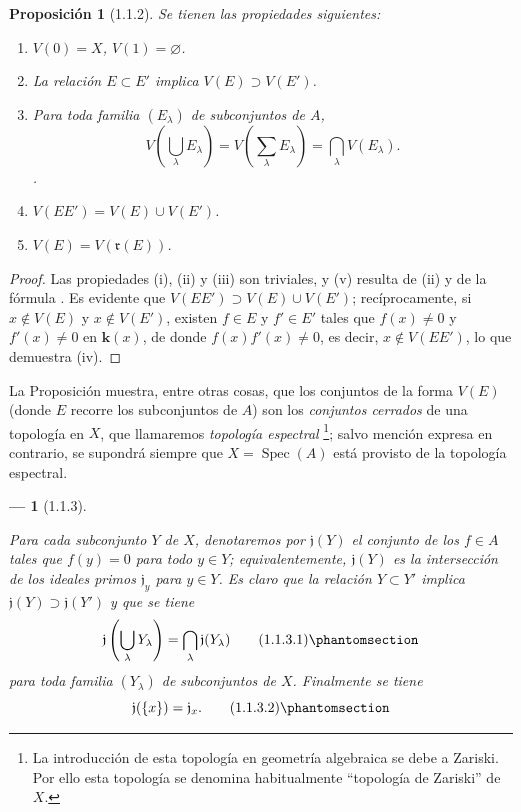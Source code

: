 \documentclass[oneside]{amsart}
\theoremstyle{ega-env-style}
\newtheorem*{env}{---}
\theoremstyle{ega-thm-env-style}
\newtheorem*{proposition}{Proposición}
\theoremstyle{ega-defn-env-style}
\newcommand{\oldpage}[2][]{{\marginnote{\normalfont{\textbf{#1}~|~#2}}}\ignorespaces}
\let\EGAOriginalLabel\label
\renewcommand{\label}[1]{\phantomsection\EGAOriginalLabel{#1}}
\begin{document}
\begin{proposition}[1.1.2]
\label{I.1.1.2}
Se tienen las propiedades siguientes:
\begin{enumerate}
  \item[{\rm(i)}] $V(0)=X$, $V(1)=\varnothing$.
  \item[{\rm(ii)}] La relación $E\subset E'$ implica $V(E)\supset V(E')$.
  \item[{\rm(iii)}] Para toda familia $(E_\lambda)$ de subconjuntos de $A$, \[
    V\left(\bigcup_\lambda E_\lambda\right)
      =V\left(\sum_\lambda E_\lambda\right)
      =\bigcap_\lambda V(E_\lambda).
  \].
  \item[{\rm(iv)}] $V(EE')=V(E)\cup V(E')$.
  \item[{\rm(v)}] $V(E)=V(\mathfrak{r}(E))$.
\end{enumerate}
\end{proposition}

\begin{proof}
Las propiedades (i), (ii) y (iii) son triviales, y (v) resulta de (ii) y de la fórmula .
Es evidente que $V(EE')\supset V(E)\cup V(E')$;
recíprocamente, si $x\notin V(E)$ y $x\notin V(E')$, existen $f\in E$ y $f'\in E'$ tales que $f(x)\neq0$ y $f'(x)\neq0$ en $\boldsymbol{k}(x)$, de donde $f(x)f'(x)\neq0$, es decir, $x\notin V(EE')$, lo que demuestra (iv).
\end{proof}

La Proposición  muestra, entre otras cosas, que los conjuntos de la forma $V(E)$ (donde $E$ recorre los subconjuntos de $A$) son los \emph{conjuntos cerrados} de una topología en $X$, que llamaremos \emph{topología espectral}
\footnote{La introducción de esta topología en geometría algebraica se debe a Zariski.
Por ello esta topología se denomina habitualmente ``topología de Zariski'' de $X$.};
salvo mención expresa en contrario, se supondrá siempre que $X=\operatorname{Spec}(A)$ está provisto de la topología espectral.


\oldpage[I]{81}
\begin{env}[1.1.3]
\label{I.1.1.3}

Para cada subconjunto $Y$ de $X$, denotaremos por $\mathfrak{j}(Y)$ el conjunto de los $f\in A$ tales que $f(y)=0$ para todo $y\in Y$;
equivalentemente, $\mathfrak{j}(Y)$ es la intersección de los ideales primos $\mathfrak{j}_y$ para $y\in Y$.
Es claro que la relación $Y\subset Y'$ implica $\mathfrak{j}(Y)\supset\mathfrak{j}(Y')$ y que se tiene
\begin{equation}
  \mathfrak{j}\left(\bigcup_\lambda Y_\lambda\right)
    =\bigcap_\lambda\mathfrak{j}(Y_\lambda)
  \tag{1.1.3.1}\label{I.1.1.3.1-fr}
\end{equation}
para toda familia $(Y_\lambda)$ de subconjuntos de $X$.
Finalmente se tiene
\begin{equation}
  \mathfrak{j}(\{x\})=\mathfrak{j}_x.
  \tag{1.1.3.2}\label{I.1.1.3.2-fr}
\end{equation}
\end{env}
\end{document}
